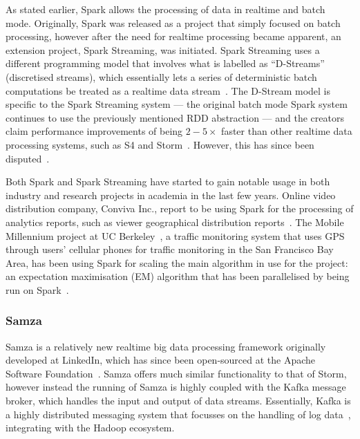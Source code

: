 \documentclass[a4paper,11pt]{article}
\begin{document}
As stated earlier, Spark allows the processing of data in realtime and batch mode. Originally, Spark was released as a
project that simply focused on batch processing, however after the need for realtime processing became apparent, an
extension project, Spark Streaming, was initiated. Spark Streaming uses a different programming model that involves what
is labelled as ``D-Streams'' (discretised streams), which essentially lets a series of deterministic batch computations
be treated as a realtime data stream~\cite{zaharia2012discretized}. The D-Stream model is specific to the Spark Streaming
system --- the original batch mode Spark system continues to use the previously mentioned RDD abstraction --- and the
creators claim performance improvements of being $2-5\times$ faster than  other realtime data processing systems, such as S4
and Storm~\cite{zaharia2013discretized}. However, this has since been disputed~\cite{web_slideshare_b}.

Both Spark and Spark Streaming have started to gain notable usage in both industry and research projects in academia in
the last few years. Online video distribution company, Conviva Inc., report to be using Spark for the processing of
analytics reports, such as viewer geographical distribution reports~\cite{web_spark_conviva,zaharia2012fast}. The Mobile
Millennium project at UC Berkeley~\cite{web_spark_mmp}, a traffic monitoring system that uses GPS through users'
cellular phones for traffic monitoring in the San Francisco Bay Area, has been using Spark for scaling the main
algorithm in use for the project: an expectation maximisation (EM) algorithm that has been parallelised by being run on
Spark~\cite{hunter2011scaling}.


\subsubsection{Samza} %
\label{ssub:samza}

Samza is a relatively new realtime big data processing framework originally developed at LinkedIn, which has since been
open-sourced at the Apache Software Foundation~\cite{web_samza}. Samza offers much similar functionality to that of
Storm, however instead the running of Samza is highly coupled with the Kafka message broker, which handles the input
and output of data streams. Essentially, Kafka is a highly distributed messaging system that focusses on the handling
of log data~\cite{kreps2011kafka}, integrating with the Hadoop ecosystem.
\end{document}
